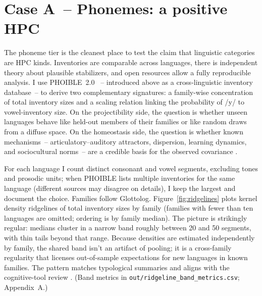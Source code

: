 \documentclass[12pt]{article}
\begin{document}
\section{Case A~-- Phonemes: a positive HPC}\label{sec:case-phoneme}

The phoneme tier is the cleanest place to test the claim that linguistic categories are HPC kinds. Inventories are comparable across languages, there is independent theory about plausible stabilizers, and open resources allow a fully reproducible analysis. I use PHOIBLE~2.0 \citep{MoranEtAl2019PHOIBLE}~-- introduced above as a cross-linguistic inventory database~-- to derive two complementary signatures: a family-wise concentration of total inventory sizes and a scaling relation linking the probability of /y/ to vowel-inventory size. On the projectibility side, the question is whether unseen languages behave like held-out members of their families or like random draws from a diffuse space. On the homeostasis side, the question is whether known mechanisms~-- articulatory–auditory attractors, dispersion, learning dynamics, and sociocultural norms~-- are a credible basis for the observed covariance \citep{Stevens1989Quantal,LiljencrantsLindblom1972,Lindblom1990HandH,Ekstrom2025PhonemeTool}.

For each language I count distinct consonant and vowel segments, excluding tones and prosodic units; when PHOIBLE lists multiple inventories for the same language (different sources may disagree on details), I keep the largest and document the choice. Families follow Glottolog. Figure~\ref{fig:ridgelines} plots kernel density ridgelines of total inventory sizes by family (families with fewer than ten languages are omitted; ordering is by family median). The picture is strikingly regular: medians cluster in a narrow band roughly between 20 and 50 segments, with thin tails beyond that range. Because densities are estimated independently by family, the shared band isn't an artifact of pooling; it is a cross-family regularity that licenses out-of-sample expectations for new languages in known families. The pattern matches typological summaries and aligns with the cognitive-tool review \citep[Fig.\,1]{Ekstrom2025PhonemeTool}. (Band metrics in \texttt{out/ridgeline\_band\_metrics.csv}; Appendix~A.)
\end{document}
